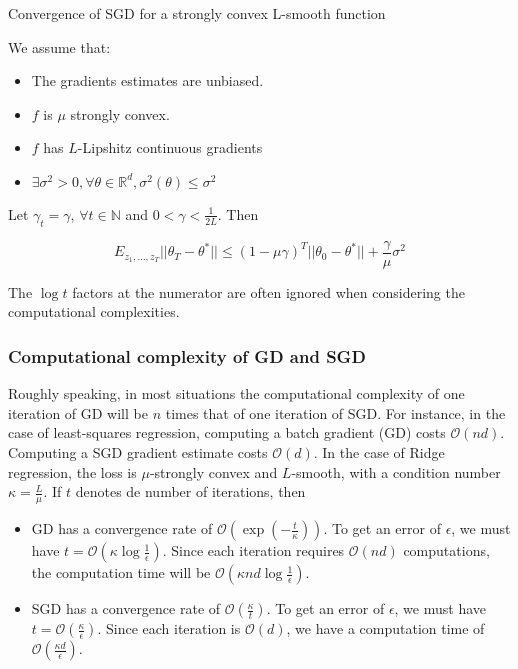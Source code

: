 \documentclass[
10pt, %
a4paper, %
oneside, %
headinclude,footinclude, %
BCOR5mm, %
]{scrartcl}
\begin{document}
\begin{theorem}{Convergence of SGD for a strongly convex L-smooth function}
    
    We assume that:
    \begin{itemize}
	\item The gradients estimates are unbiased.
        \item $f$ is $\mu$ strongly convex.
	\item $f$ has $L$-Lipshitz continuous gradients
	\item $\exists \sigma^2>0, \forall \theta \in \mathbb{R}^d, \sigma^2(\theta)\leq \sigma^2$
    \end{itemize}
    Let $\gamma_t = \gamma$, $\forall t\in \mathbb{N} $ and $ 0<\gamma < \frac{1}{2L} $. Then

    \begin{equation}
	E_{z_1, \dots, z_T}||\theta_T-\theta^*||\leq (1-\mu\gamma)^T||\theta_0-\theta^*|| + \frac{ \gamma}{\mu} \sigma^2
    \end{equation}
\end{theorem}

\begin{remark}
    The $\log t$ factors at the numerator are often ignored when considering the computational complexities.
\end{remark}

\subsubsection{\large\color{Periwinkle}Computational complexity of GD and SGD}

Roughly speaking, in most situations the computational complexity of one
iteration of GD will be $n$ times that of one iteration of SGD. For instance, in the case of least-squares regression, computing a batch gradient (GD) costs $ \mathcal{O} (nd)$. Computing a SGD gradient estimate costs $ \mathcal{O} (d)$. In the case of Ridge regression, the loss is $\mu$-strongly convex and $L$-smooth, with a condition number $\kappa = \frac{L}{\mu} $. If $t$ denotes de number of iterations, then
\begin{itemize}
    \item GD has a convergence rate of $\mathcal{O} (\exp( - \frac{t}{\kappa} ))$. To get an error of $\epsilon$, we must have $ t= \mathcal{O} ( \kappa \log \frac{1}{\epsilon} )$. Since each iteration requires $ \mathcal{O} (nd)$ computations, the computation time will be $ \mathcal{O} (\kappa nd\log\frac{1}{\epsilon}) $.
    \item SGD has a convergence rate of $ \mathcal{O} ( \frac{\kappa}{t} )$. To get an error of $\epsilon$, we must have $ t = \mathcal{O}( \frac{\kappa}{\epsilon} ) $. Since each iteration is $ \mathcal{O} (d)$, we have a computation time of $ \mathcal{O} ( \frac{\kappa d}{\epsilon} )$.

\end{itemize}
\end{document}
